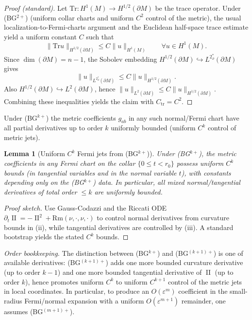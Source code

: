 \documentclass[11pt,reqno,a4paper]{amsart}
\DeclareMathOperator{\II}{II}
\numberwithin{equation}{section}
\theoremstyle{plain}
\newtheorem{lemma}[theorem]{Lemma}
\theoremstyle{remark}
\theoremstyle{plain}
\begin{document}
\begin{proof}[Proof (standard)]
Let $\mathrm{Tr}:H^1(M)\to H^{1/2}(\partial M)$ be the trace operator. Under \textup{(BG$^{2+}$)} (uniform collar charts and
uniform $C^2$ control of the metric), the usual localization-to-Fermi-charts argument and the Euclidean half-space trace
estimate yield a uniform constant $C$ such that
\[
\|\mathrm{Tr}u\|_{H^{1/2}(\partial M)} \le C\|u\|_{H^1(M)}\qquad\forall u\in H^1(M).
\]
Since $\dim(\partial M)=n-1$, the Sobolev embedding $H^{1/2}(\partial M)\hookrightarrow L^{2^*_\partial}(\partial M)$ gives
\[
\|u\|_{L^{2^*_\partial}(\partial M)} \le C\|u\|_{H^{1/2}(\partial M)}.
\]
Also $H^{1/2}(\partial M)\hookrightarrow L^2(\partial M)$, hence $\|u\|_{L^2(\partial M)}\le C\|u\|_{H^{1/2}(\partial M)}$.
Combining these inequalities yields the claim with $C_{\mathrm{tr}}=C^2$.
\end{proof}

Under \textup{(BG$^{k+}$)} the metric coefficients $g_{ab}$ in any such normal/Fermi chart have all partial derivatives up to order $k$ uniformly bounded (uniform $C^k$ control of metric jets).
\begin{lemma}[Uniform $C^k$ Fermi jets from \textup{(BG$^{k+}$)}]\label{lem:fermi-jets}
Under \textup{(BG$^{k+}$)}, the metric coefficients in any Fermi chart on the collar $\{0\le t<r_0\}$ possess uniform $C^k$ bounds (in tangential variables and in the normal variable $t$), with constants depending only on the \textup{(BG$^{k+}$)} data. In particular, all mixed normal/tangential derivatives of total order $\le k$ are uniformly bounded.
\end{lemma}

\begin{proof}[Proof sketch]
Use Gauss-Codazzi and the Riccati ODE $\partial_t \II = -\II^2 + \mathrm{Rm}(\nu,\cdot,\nu,\cdot)$ to control normal derivatives from curvature bounds in (ii), while tangential derivatives are controlled by (iii). A standard bootstrap yields the stated $C^k$ bounds.
\end{proof}

\medskip
\noindent\emph{Order bookkeeping.} The distinction between \textup{(BG$^{k+}$)} and \textup{(BG$^{(k+1)+}$)} is one of available derivatives: \textup{(BG$^{(k+1)+}$)} adds one more bounded curvature derivative (up to order $k-1$) and one more bounded tangential derivative of $\II$ (up to order $k$), hence promotes uniform $C^k$ to uniform $C^{k+1}$ control of the metric jets in local coordinates. In particular, to produce an $O(\varepsilon^m)$ coefficient in the small-radius Fermi/normal expansion with a uniform $O(\varepsilon^{m+1})$ remainder, one assumes \textup{(BG$^{(m+1)+}$)}.
\end{document}
